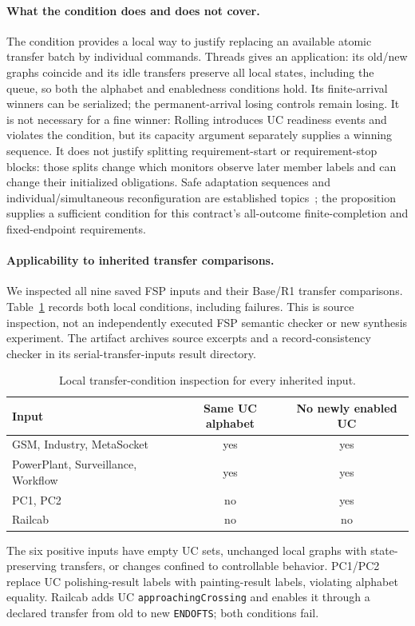 \paragraph{What the condition does and does not cover.}
The condition provides a local way to justify replacing an available atomic transfer batch by individual commands. Threads gives an application: its old/new graphs coincide and its idle transfers preserve all local states, including the queue, so both the alphabet and enabledness conditions hold. Its finite-arrival winners can be serialized; the permanent-arrival losing controls remain losing. It is not necessary for a fine winner: Rolling introduces UC readiness events and violates the condition, but its capacity argument separately supplies a winning sequence. It does not justify splitting requirement-start or requirement-stop blocks: those splits change which monitors observe later member labels and can change their initialized obligations. Safe adaptation sequences and individual/simultaneous reconfiguration are established topics~\cite{BoyerGruberPous2013,ThuijsmanReniers2024DynamicFeature}; the proposition supplies a sufficient condition for this contract's all-outcome finite-completion and fixed-endpoint requirements.


\paragraph{Applicability to inherited transfer comparisons.}
We inspected all nine saved FSP inputs and their Base/R1 transfer comparisons. Table~\ref{tab:serial-inputs} records both local conditions, including failures. This is source inspection, not an independently executed FSP semantic checker or new synthesis experiment. The artifact archives source excerpts and a record-consistency checker in its serial-transfer-inputs result directory.
\begin{table}[!htbp]\centering\small
\caption{Local transfer-condition inspection for every inherited input.}\label{tab:serial-inputs}
\begin{tabular}{@{}lcc@{}}\toprule
Input & Same UC alphabet & No newly enabled UC\\\midrule
GSM, Industry, MetaSocket & yes & yes\\
PowerPlant, Surveillance, Workflow & yes & yes\\
PC1, PC2 & no & yes\\
Railcab & no & no\\\bottomrule
\end{tabular}
\end{table}
\FloatBarrier
The six positive inputs have empty UC sets, unchanged local graphs with state-preserving transfers, or changes confined to controllable behavior. PC1/PC2 replace UC polishing-result labels with painting-result labels, violating alphabet equality. Railcab adds UC \texttt{approachingCrossing} and enables it through a declared transfer from old to new \texttt{ENDOFTS}; both conditions fail.

